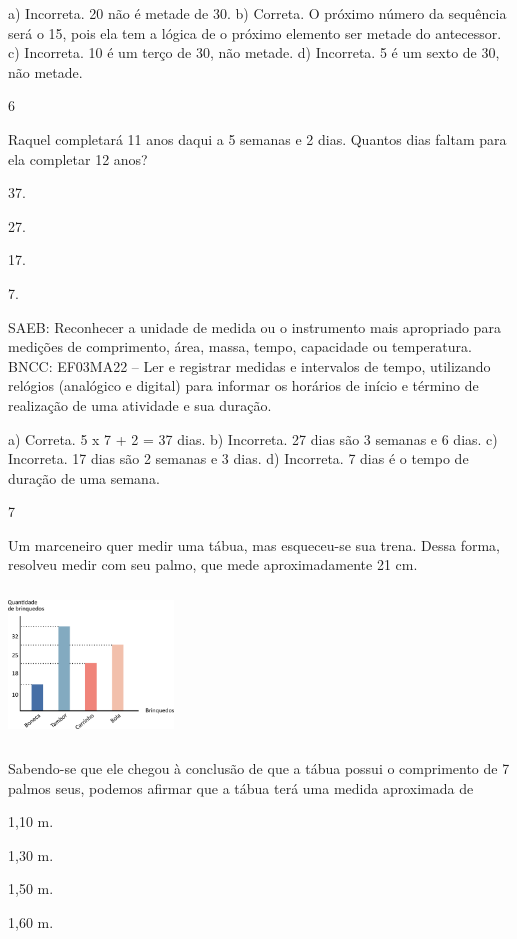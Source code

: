 \begin{multicols}{2}
\begin{enumerate}
{a) Incorreta. 20 não é metade de 30.
b) Correta. O próximo número da sequência será o 15, pois ela tem a lógica de o próximo
elemento ser metade do antecessor.
c) Incorreta. 10 é um terço de 30, não metade.
d) Incorreta. 5 é um sexto de 30, não metade.

\num{6}

Raquel completará 11 anos daqui a 5 semanas e 2 dias. Quantos dias faltam para ela completar 12 anos?

\begin{escolha}
\item
  37.
\item
  27.
\item
  17.
\item
  7.
\end{escolha}

SAEB: Reconhecer a unidade de medida ou o instrumento mais apropriado para medições de comprimento, área, massa, tempo, capacidade
ou temperatura.
BNCC: EF03MA22 -- Ler e registrar medidas e intervalos de tempo, utilizando relógios (analógico e
digital) para informar os horários de início e término de realização de uma atividade e sua
duração.

a) Correta. 5 x 7 + 2 = 37 dias.
b) Incorreta. 27 dias são 3 semanas e 6 dias.
c) Incorreta. 17 dias são 2 semanas e 3 dias.
d) Incorreta. 7 dias é o tempo de duração de uma semana.

\num{7}

Um marceneiro quer medir uma tábua, mas esqueceu-se sua trena. Dessa forma, resolveu medir com seu palmo, que mede aproximadamente 21 cm.


\includegraphics[width=1.73077in,height=1.57654in]{media/image119.png}

Sabendo-se que ele chegou à conclusão de que a tábua possui o comprimento de 7 palmos seus, podemos afirmar que a tábua terá uma medida aproximada de

\begin{escolha}
\item
  1,10 m.
\item
  1,30 m.
\item
  1,50 m.
\item
  1,60 m.
\end{escolha}

}
\end{enumerate}
\end{multicols}
